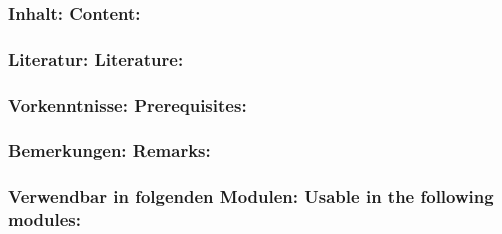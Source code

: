 \documentclass[a4paper,10pt]{article}
\begin{document}
\subsubsection*{\large
    Inhalt:
    Content:
}
\subsubsection*{\large
    Literatur:
    Literature:
}
\subsubsection*{\large
    Vorkenntnisse:
    Prerequisites:
}
\subsubsection*{\large
    Bemerkungen:
    Remarks:
}
\subsubsection*{\large
    Verwendbar in folgenden Modulen:
    Usable in the following modules:
}
\\

\end{document}
